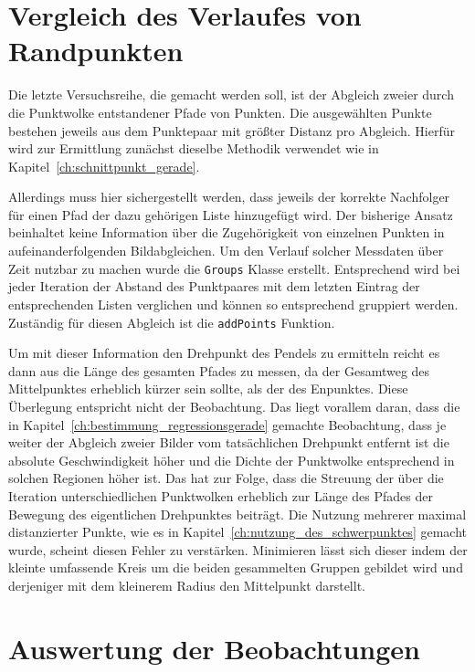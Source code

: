 \section{Vergleich des Verlaufes von Randpunkten}\label{ch:vergleich_verlauf_randpunkte}

Die letzte Versuchsreihe, die gemacht werden soll, ist der Abgleich zweier durch die Punktwolke entstandener Pfade von Punkten.
Die ausgewählten Punkte bestehen jeweils aus dem Punktepaar mit grö{\ss}ter Distanz pro Abgleich.
Hierfür wird zur Ermittlung zunächst dieselbe Methodik verwendet wie in Kapitel~\ref{ch:schnittpunkt_gerade}.

Allerdings muss hier sichergestellt werden, dass jeweils der korrekte Nachfolger für einen Pfad der dazu gehörigen Liste hinzugefügt wird.
Der bisherige Ansatz beinhaltet keine Information über die Zugehörigkeit von einzelnen Punkten in aufeinanderfolgenden Bildabgleichen.
Um den Verlauf solcher Messdaten über Zeit nutzbar zu machen wurde die \lstinline{Groups} Klasse erstellt.
Entsprechend wird bei jeder Iteration der Abstand des Punktpaares mit dem letzten Eintrag der entsprechenden Listen verglichen und können so entsprechend gruppiert werden.
Zuständig für diesen Abgleich ist die \lstinline{addPoints} Funktion.

Um mit dieser Information den Drehpunkt des Pendels zu ermitteln reicht es dann aus die Länge des gesamten Pfades zu messen, da der Gesamtweg des Mittelpunktes erheblich kürzer sein sollte, als der des Enpunktes.
Diese Überlegung entspricht nicht der Beobachtung.
Das liegt vorallem daran, dass die in Kapitel~\ref{ch:bestimmung_regressionsgerade} gemachte Beobachtung, dass je weiter der Abgleich zweier Bilder vom tatsächlichen Drehpunkt entfernt ist die absolute Geschwindigkeit höher und die Dichte der Punktwolke entsprechend in solchen Regionen höher ist.
Das hat zur Folge, dass die Streuung der über die Iteration unterschiedlichen Punktwolken erheblich zur Länge des Pfades der Bewegung des eigentlichen Drehpunktes beiträgt.
Die Nutzung mehrerer maximal distanzierter Punkte, wie es in Kapitel~\ref{ch:nutzung_des_schwerpunktes} gemacht wurde, scheint diesen Fehler zu verstärken.
Minimieren lässt sich dieser indem der kleinte umfassende Kreis um die beiden gesammelten Gruppen gebildet wird und derjeniger mit dem kleinerem Radius den Mittelpunkt darstellt.

\section{Auswertung der Beobachtungen}

